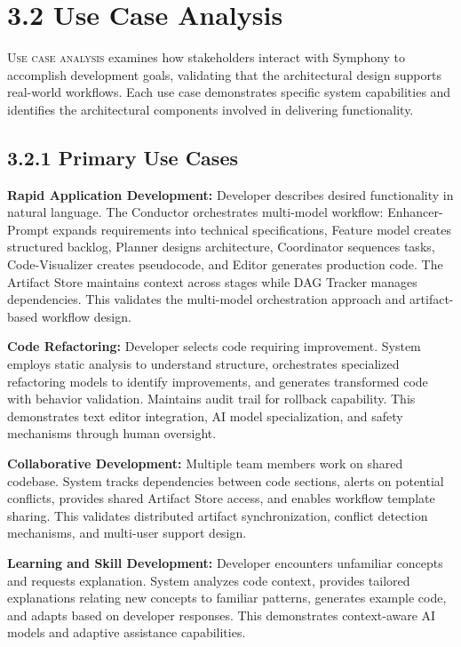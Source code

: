 
\section{3.2 Use Case Analysis}
\label{sec:use-case-analysis}

\lettrine{U}{se case analysis} examines how stakeholders interact with Symphony to accomplish development goals, validating that the architectural design supports real-world workflows. Each use case demonstrates specific system capabilities and identifies the architectural components involved in delivering functionality.

\subsection*{3.2.1 Primary Use Cases}

\textbf{Rapid Application Development:} Developer describes desired functionality in natural language. The Conductor orchestrates multi-model workflow: Enhancer-Prompt expands requirements into technical specifications, Feature model creates structured backlog, Planner designs architecture, Coordinator sequences tasks, Code-Visualizer creates pseudocode, and Editor generates production code. The Artifact Store maintains context across stages while DAG Tracker manages dependencies. This validates the multi-model orchestration approach and artifact-based workflow design.

\textbf{Code Refactoring:} Developer selects code requiring improvement. System employs static analysis to understand structure, orchestrates specialized refactoring models to identify improvements, and generates transformed code with behavior validation. Maintains audit trail for rollback capability. This demonstrates text editor integration, AI model specialization, and safety mechanisms through human oversight.

\textbf{Collaborative Development:} Multiple team members work on shared codebase. System tracks dependencies between code sections, alerts on potential conflicts, provides shared Artifact Store access, and enables workflow template sharing. This validates distributed artifact synchronization, conflict detection mechanisms, and multi-user support design.

\textbf{Learning and Skill Development:} Developer encounters unfamiliar concepts and requests explanation. System analyzes code context, provides tailored explanations relating new concepts to familiar patterns, generates example code, and adapts based on developer responses. This demonstrates context-aware AI models and adaptive assistance capabilities.


